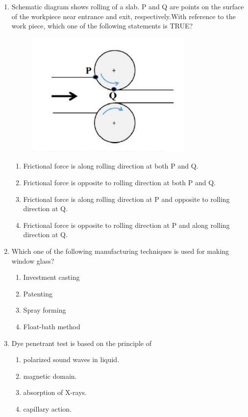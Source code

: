 \documentclass[journal]{IEEEtran}
\theoremstyle{remark}
\begin{document}
\begin{enumerate}
\item Schematic diagram shows rolling of a slab. P and Q are points on the surface of the workpiece near entrance and exit, respectively.With reference to the work piece, which one of the following statements is TRUE?
\begin{figure}[H]
    \centering
    \includegraphics[width=0.4\columnwidth]{figs/Q.23.png}
    \caption{}
    \label{fig:placeholder}
\end{figure}
 \hfill{}
\begin{enumerate}
    \item Frictional force is along rolling direction at both P and Q.
    \item Frictional force is opposite to rolling direction at both P and Q.
    \item Frictional force is along rolling direction at P and opposite to rolling direction at Q.
    \item Frictional force is opposite to rolling direction at P and along rolling direction at Q.
\end{enumerate}

\item Which one of the following manufacturing techniques is used for making window glass? \hfill{}
\begin{multicols}{2}
\begin{enumerate}
    \item Investment casting
    \item Patenting
    \item Spray forming
    \item Float-bath method
\end{enumerate}
\end{multicols}

\item Dye penetrant test is based on the principle of \hfill{}
\begin{multicols}{2}
\begin{enumerate}
    \item polarized sound waves in liquid.
    \item magnetic domain.
    \item absorption of X-rays.
    \item capillary action.
\end{enumerate}
\end{multicols}




\end{enumerate}
\end{document}
